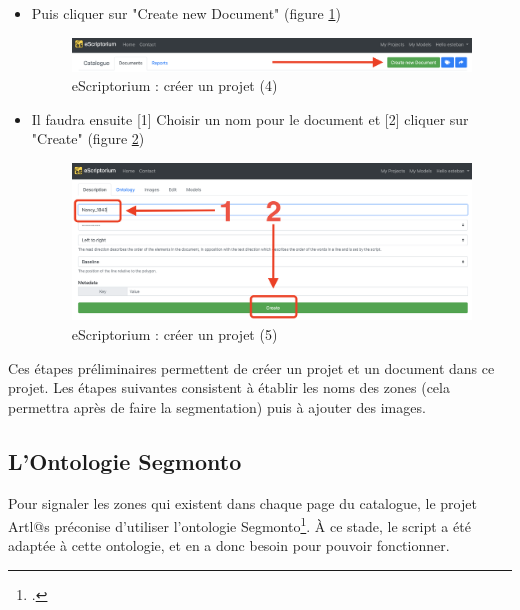 \documentclass[a4paper,12pt,twoside]{book}
\begin{document}
\begin{itemize}
\item Puis cliquer sur "Create new Document" (figure \ref{create4})
\begin{figure}[ht]
	\centering
	\includegraphics[scale=0.3]{new_document_eScriptorium.png}		
	\caption{eScriptorium : créer un projet (4)}
	\label{create4}
\end{figure}

\item Il faudra ensuite [1] Choisir un nom pour le document et [2] cliquer sur "Create" (figure \ref{create})
\begin{figure}[ht]
	\centering
	\includegraphics[scale=0.2]{create_doc_eScriptorium.png}		
	\caption{eScriptorium : créer un projet (5)}
	\label{create}
\end{figure}
\end{itemize}

Ces étapes préliminaires permettent de créer un projet et un document dans ce projet. Les étapes suivantes consistent à établir les noms des zones (cela permettra après de faire la segmentation) puis à ajouter des images. 


	\subsection{L'Ontologie Segmonto}

Pour signaler les zones qui existent dans chaque page du catalogue, le projet Artl@s préconise d'utiliser l'ontologie Segmonto\footcite{noauthor_segmonto_nodate}. À ce stade, le script a été adaptée à cette ontologie, et en a donc besoin pour pouvoir fonctionner. 
\end{document}
